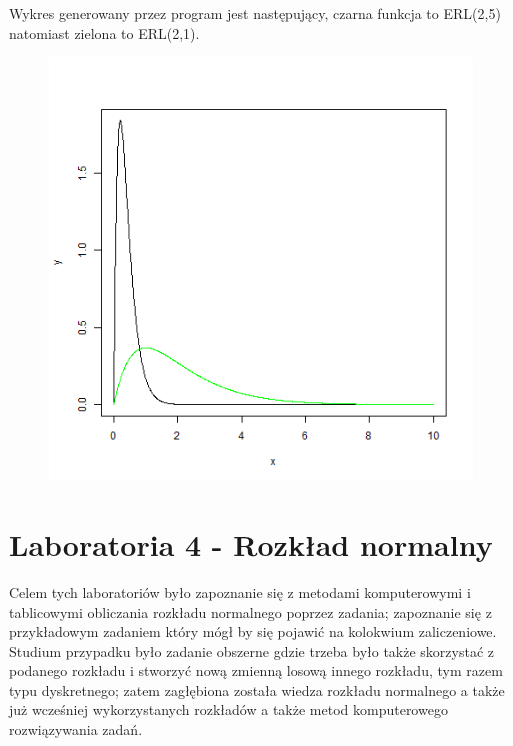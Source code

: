 \documentclass{article}
\begin{document}
{Wykres generowany przez program jest następujący, czarna funkcja to ERL(2,5) natomiast zielona to ERL(2,1).
\newpage
{
\vspace*{\fill}
\begin{figure}[h!]
\begin{center}
\includegraphics[height = 0.5\textheight]{"zad2_27_f1.png"}
\end{center}
\end{figure}
\vspace*{\fill}
}

\newpage
\part{Laboratoria 4 - Rozkład normalny}

Celem tych laboratoriów było zapoznanie się z metodami komputerowymi i tablicowymi obliczania rozkładu normalnego poprzez zadania; zapoznanie się z przykładowym zadaniem który mógł by się pojawić na kolokwium zaliczeniowe. \\
Studium przypadku było zadanie obszerne gdzie trzeba było także skorzystać z podanego rozkładu i stworzyć nową zmienną losową innego rozkładu, tym razem typu dyskretnego; zatem zagłębiona została wiedza rozkładu normalnego a także już wcześniej wykorzystanych rozkładów a także metod komputerowego rozwiązywania zadań.

}
\end{document}
